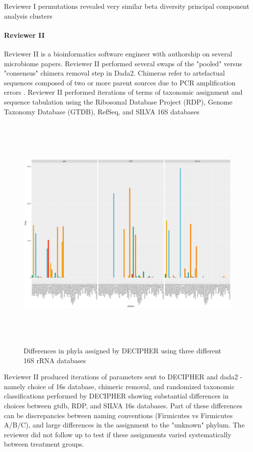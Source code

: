 \documentclass{drexelthesis}
\begin{document}
Reviewer I permutations revealed very similar beta diversity principal component analysis clusters

\paragraph{Reviewer II}

Reviewer II is a bioinformatics software engineer with authorship on several microbiome papers. Reviewer II performed several swaps of the "pooled" versus "consensus" chimera removal step in Dada2. Chimeras refer to artefactual sequences composed of two or more parent sources due to PCR amplification errors \cite{De_la_Cuesta-Zuluaga2016-fr}. Reviewer II performed iterations of terms of taxonomic assignment and sequence tabulation using the Ribosomal Database Project (RDP), Genome Taxonomy Database (GTDB), RefSeq, and SILVA 16S databases


\begin{figure}[h!]
	\centering
	\includegraphics[width=\textwidth,height=11.89cm]{./images/decipher.png}
	\caption{Differences in phyla assigned by DECIPHER using three different 16S rRNA databases}
	\label{decipher}
\end{figure}


Reviewer II produced iterations of parameters sent to DECIPHER and dada2 - namely choice of 16s database, chimeric removal, and randomized taxonomic classifications performed by DECIPHER showing substantial differences in choices between gtdb, RDP, and SILVA 16s databases. Part of these differences can be discrepancies between naming conventions (Firmicutes vs Firmicutes A/B/C), and large differences in the assignment to the "unknown" phylum. The reviewer did not follow up to test if these assignments varied systematically between treatment groups.
\end{document}
